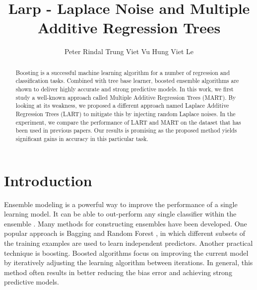 \documentclass{article} %
\title{Larp - Laplace Noise and Multiple Additive Regression Trees}
\author{Peter Rindal 
\And
Trung Viet Vu 
\And
Hung Viet Le}
\begin{document}
 
\maketitle

\begin{abstract}

Boosting is a successful machine learning algorithm for a number of regression and classification tasks. Combined with tree base learner, boosted ensemble algorithms are shown to deliver highly accurate and strong predictive models. In this work, we first study a well-known approach called Multiple Additive Regression Trees (MART). By looking at its weakness, we proposed a different approach named Laplace Additive Regression Trees (LART) to mitigate this by injecting random Laplace noises. In the experiment, we compare the performance of LART and MART on the dataset that has been used in previous papers. Our results is promising as the proposed method yields significant gains in accuracy in this particular task.

\end{abstract}

\section{Introduction}


Ensemble modeling is a powerful way to improve the performance of a single learning model.  It can be able to out-perform any single classifier within the ensemble \cite{Dietterich2000}. Many methods for constructing ensembles have been developed. One popular approach is Bagging and Random Forest \cite{Breiman2001}, in which different subsets of the training examples are used to learn independent predictors. Another practical technique is boosting. Boosted algorithms focus on improving the current model by iteratively adjusting the learning algorithm between iterations. In general, this method often results in better reducing the bias error and achieving strong predictive models. \\
\end{document}
